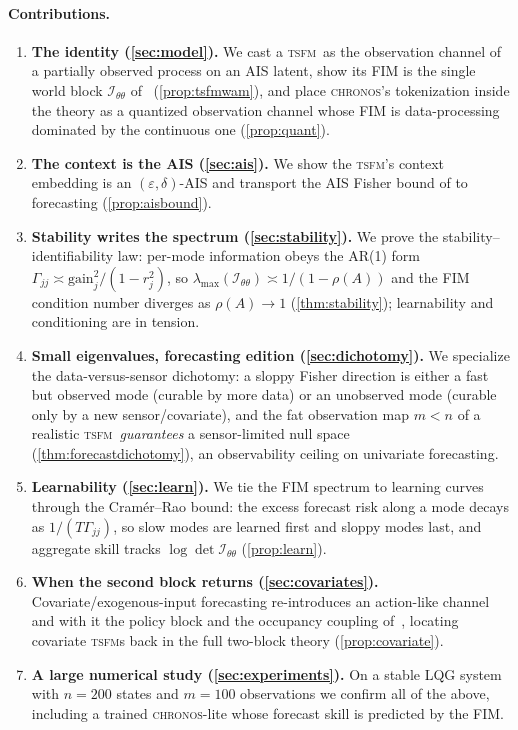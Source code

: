 \documentclass[10pt]{article}
\theoremstyle{plain}
\theoremstyle{definition}
\theoremstyle{remark}
\newcommand{\Fisher}{\mathcal{I}}
\newcommand{\Ith}{\Fisher_{\theta\theta}}
\newcommand{\eps}{\varepsilon}
\newcommand{\TSFM}{\textsc{tsfm}}
\newcommand{\Chronos}{\textsc{chronos}}
\begin{document}
\paragraph{Contributions.}
\begin{enumerate}[leftmargin=1.6em,itemsep=2pt]
\item \textbf{The identity (\cref{sec:model}).} We cast a \TSFM\ as the
observation channel of a partially observed process on an AIS latent, show its
FIM is the single world block $\Ith$ of~\cite{wamvla} (\cref{prop:tsfmwam}),
and place \Chronos's tokenization inside the theory as a quantized observation
channel whose FIM is data-processing dominated by the continuous one
(\cref{prop:quant}).
\item \textbf{The context is the AIS (\cref{sec:ais}).} We show the \TSFM's
context embedding is an $(\eps,\delta)$-AIS and transport the AIS Fisher bound of
\cite{wamvla} to forecasting (\cref{prop:aisbound}).
\item \textbf{Stability writes the spectrum (\cref{sec:stability}).} We prove
the stability--identifiability law: per-mode information obeys the AR(1) form
$\Gamma_{jj}\asymp \mathrm{gain}_j^2/(1-r_j^2)$, so $\lambda_{\max}(\Ith)\asymp
1/(1-\rho(A))$ and the FIM condition number diverges as $\rho(A)\to1$
(\cref{thm:stability}); learnability and conditioning are in tension.
\item \textbf{Small eigenvalues, forecasting edition (\cref{sec:dichotomy}).}
We specialize the data-versus-sensor dichotomy: a sloppy Fisher direction is
either a fast but observed mode (curable by more data) or an unobserved mode
(curable only by a new sensor/covariate), and the fat observation map $m<n$ of a
realistic \TSFM\ \emph{guarantees} a sensor-limited null space
(\cref{thm:forecastdichotomy}), an observability ceiling on univariate
forecasting.
\item \textbf{Learnability (\cref{sec:learn}).} We tie the FIM spectrum to
learning curves through the Cram\'er--Rao bound: the excess forecast risk along
a mode decays as $1/(T\Gamma_{jj})$, so slow modes are learned first and sloppy
modes last, and aggregate skill tracks $\log\det\Ith$ (\cref{prop:learn}).
\item \textbf{When the second block returns (\cref{sec:covariates}).}
Covariate/exogenous-input forecasting re-introduces an action-like channel and
with it the policy block and the occupancy coupling of~\cite{wamvla}, locating
covariate \TSFM s back in the full two-block theory (\cref{prop:covariate}).
\item \textbf{A large numerical study (\cref{sec:experiments}).} On a stable LQG
system with $n=200$ states and $m=100$ observations we confirm all of the above,
including a trained \Chronos-lite whose forecast skill is predicted by the FIM.
\end{enumerate}
\end{document}
